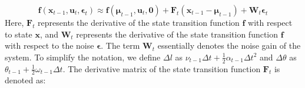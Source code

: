 \documentclass[12pt, a4paper]{article}
\begin{document}
\[
  \bm{f}(\bm{x}_{t-1}, \bm{u}_{t}, \bm{\epsilon}_{t}) \approx \bm{f}(\bm{\mu}_{t-1}, \bm{u}_{t}, \bm{0})+\bm{F}_{t}(\bm{x}_{t-1}-\bm{\mu}_{t-1})+\bm{W}_{t}\bm{\epsilon}_{t}
\]
Here, $\bm{F}_{t}$ represents the derivative of the state transition function $\bm{f}$ with respect to state $\bm{x}$, and $\bm{W}_{t}$ represents the derivative of the state transition function $\bm{f}$ with respect to the noise $\bm{\epsilon}$. The term $\bm{W}_{t}$ essentially denotes the noise gain of the system. To simplify the notation, we define $\Delta l$ as $\nu_{t-1}\Delta t + \frac{1}{2}\alpha_{t-1}\Delta t^2$ and $\Delta\theta$ as $\theta_{t-1} + \frac{1}{2}\omega_{t-1}\Delta t$. The derivative matrix of the state transition function $\bm{F}_{t}$ is denoted as:
\end{document}
